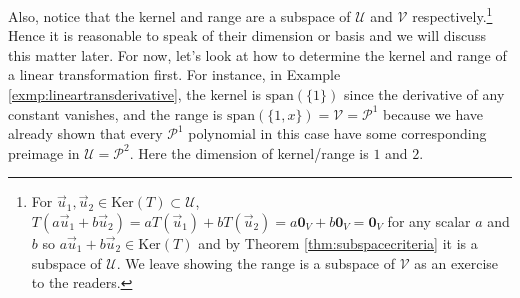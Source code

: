 Also, notice that the kernel and range are a subspace of $\mathcal{U}$ and $\mathcal{V}$ respectively.\footnote{For $\vec{u}_1, \vec{u}_2 \in \text{Ker}(T) \subset \mathcal{U}$, $T(a\vec{u}_1 + b\vec{u}_2) = aT(\vec{u}_1) + bT(\vec{u}_2) = a\textbf{0}_V + b\textbf{0}_V = \textbf{0}_V$ for any scalar $a$ and $b$ so $a\vec{u}_1 + b\vec{u}_2 \in \text{Ker}(T)$ and by Theorem \ref{thm:subspacecriteria} it is a subspace of $\mathcal{U}$. We leave showing the range is a subspace of $\mathcal{V}$ as an exercise to the readers.} Hence it is reasonable to speak of their dimension or basis and we will discuss this matter later. For now, let's look at how to determine the kernel and range of a linear transformation first. For instance, in Example \ref{exmp:lineartransderivative}, the kernel is $\text{span}(\{1\})$ since the derivative of any constant vanishes, and the range is $\text{span}(\{1, x\}) = \mathcal{V} = \mathcal{P}^1$ because we have already shown that every $\mathcal{P}^1$ polynomial in this case have some corresponding preimage in $\mathcal{U} = \mathcal{P}^2$. Here the dimension of kernel/range is $1$ and $2$.

